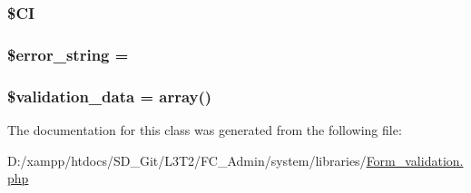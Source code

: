 \subsubsection[{\$\+C\+I}]{\setlength{\rightskip}{0pt plus 5cm}\$C\+I\hspace{0.3cm}{\ttfamily [protected]}}\label{class_c_i___form__validation_ae0314d046ddf7fcfaec03222977427d3}
\hypertarget{class_c_i___form__validation_a22323b47b58139586ed855d04138d212}{}
\subsubsection[{\$error\+\_\+string}]{\setlength{\rightskip}{0pt plus 5cm}\${\bf error\+\_\+string} = \textquotesingle{}\textquotesingle{}\hspace{0.3cm}{\ttfamily [protected]}}\label{class_c_i___form__validation_a22323b47b58139586ed855d04138d212}
\hypertarget{class_c_i___form__validation_af1df05337bb40c1d30c3d8c62fe8696c}{}
\subsubsection[{\$validation\+\_\+data}]{\setlength{\rightskip}{0pt plus 5cm}\$validation\+\_\+data = array()}\label{class_c_i___form__validation_af1df05337bb40c1d30c3d8c62fe8696c}


The documentation for this class was generated from the following file\+:\begin{DoxyCompactItemize}
\item 
D\+:/xampp/htdocs/\+S\+D\+\_\+\+Git/\+L3\+T2/\+F\+C\+\_\+\+Admin/system/libraries/\hyperlink{_form__validation_8php}{Form\+\_\+validation.\+php}\end{DoxyCompactItemize}
